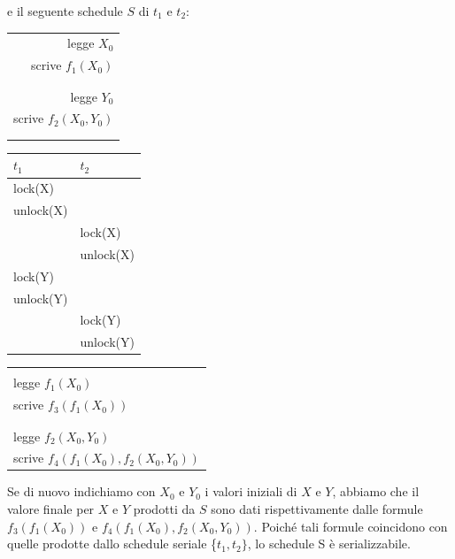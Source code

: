 e il seguente schedule $S$ di $t_1$ e $t_2$:
\begin{center}
\begin{multicols}{3}
 \begin{flushright}
\begin{tabular}{r}
   \\
   legge $X_0$\\
   scrive $f_1(X_0)$\\
   \\
   \\
   legge $Y_0$\\
   scrive $f_2(X_0, Y_0)$\\ 
   \\
   \\
  \end{tabular}
  \end{flushright}
 \begin{tabular}{|l|l|}
 \hline
 $t_1$ & $t_2$\\
 \hline
   lock(X)&\\
   unlock(X)&\\
   &lock(X)\\
   &unlock(X)\\
   lock(Y)&\\ 
   unlock(Y)&\\
   &lock(Y)\\
   &unlock(Y)\\
   \hline
  \end{tabular}
  \begin{flushleft}
  \begin{tabular}{l}
   \\
   \\
   legge $f_1(X_0)$\\
   scrive $f_3(f_1(X_0))$\\
    \\
   \\
   legge $f_2(X_0, Y_0)$\\
   scrive $f_4(f_1(X_0),f_2(X_0, Y_0))$\\ 

  \end{tabular}
  \end{flushleft}
  
\end{multicols}
\end{center}

Se di nuovo indichiamo con $X_0$ e $Y_0$ i valori iniziali di $X$ e $Y$, abbiamo che il valore finale per $X$ e $Y$
prodotti da $S$ sono dati rispettivamente dalle formule $f_3(f_1(X_0))$ e $f_4(f_1(X_0), f_2(X_0, Y_0))$. Poiché tali
formule coincidono con quelle prodotte dallo schedule seriale \{$t_1, t_2\}$, lo schedule S è serializzabile.\\


